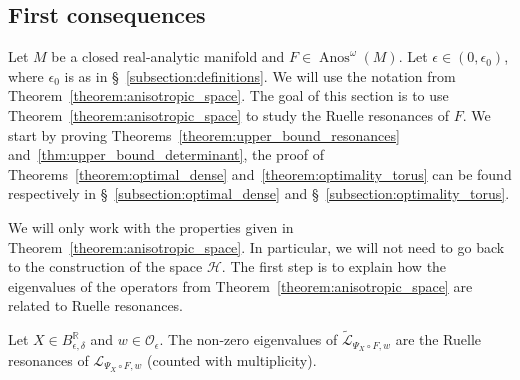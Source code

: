 \documentclass[AHL,Unicode,longabstracts,published]{cedram}
\DeclareMathOperator{\Anos}{Anos}
\newcommand{\clO}{\mathcal{O}}
\newcommand{\clL}{\mathcal{L}}
\newcommand{\clH}{\mathcal{H}}
\newcommand{\bbR}{\mathbb{R}}
\newcommand{\clO}{\mathcal{O}}
\begin{document}
\subsection{First consequences}

Let $M$ be a closed real-analytic manifold and $F \in \Anos^\omega(M)$. Let $\epsilon \in (0,\epsilon_0)$, where $\epsilon_0$ is as in \S~\ref{subsection:definitions}. We will use the notation from Theorem~\ref{theorem:anisotropic_space}. The goal of this section is to use Theorem~\ref{theorem:anisotropic_space} to study the Ruelle resonances of $F$. We start by proving Theorems~\ref{theorem:upper_bound_resonances} and~\ref{thm:upper_bound_determinant}, the proof of Theorems~\ref{theorem:optimal_dense} and~\ref{theorem:optimality_torus} can be found respectively in \S~\ref{subsection:optimal_dense} and \S~\ref{subsection:optimality_torus}.

We will only work with the properties given in Theorem~\ref{theorem:anisotropic_space}. In particular, we will not need to go back to the construction of the space $\clH$. The first step is to explain how the eigenvalues of the operators from Theorem~\ref{theorem:anisotropic_space} are related to Ruelle resonances.

\begin{prop}\label{proposition:determnation_spectrum}
Let $X \in B_{\epsilon,\delta}^{\bbR}$ and $w \in \clO_\epsilon$. The non-zero eigenvalues of $\widetilde{\clL}_{\Psi_X \circ F,w}$ are the Ruelle resonances of $\clL_{\Psi_X \circ F,w}$ (counted with multiplicity).
\end{prop}
\end{document}
